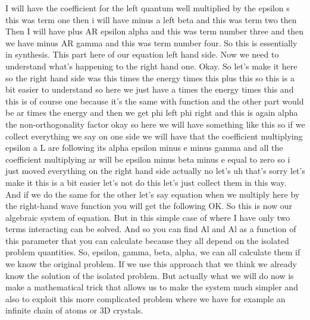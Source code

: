 I will have the coefficient for the left quantum well multiplied by the epsilon s this was term one then i will have minus a left beta and this was term two then Then I will have plus AR epsilon alpha and this was term number three and then we have minus AR gamma and this was term number four. So this is essentially in synthesis. This part here of our equation left hand side. Now we need to understand what's happening to the right hand one. Okay. So let's make it here so the right hand side was this times the energy times this plus this so this is a bit easier to understand so here we just have a times the energy times this and this is of course one because it's the same with function and the other part would be ar times the energy and then we get phi left phi right and this is again alpha the non-orthogonality factor okay so here we will have something like this so if we collect everything we say on one side we will have that the coefficient multiplying epsilon a L are following its alpha epsilon minus e minus gamma and all the coefficient multiplying ar will be epsilon minus beta minus e equal to zero so i just moved everything on the right hand side actually no let's uh that's sorry let's make it this is a bit easier let's not do this let's just collect them in this way.\\
And if we do the same for the other let's say equation when we multiply here by the right-hand wave function you will get the following OK. So this is now our algebraic system of equation. But in this simple case of where I have only two terms interacting can be solved. And so you can find Al and Al as a function of this parameter that you can calculate because they all depend on the isolated problem quantities. So, epsilon, gamma, beta, alpha, we can all calculate them if we know the original problem. If we use this approach that we think we already know the solution of the isolated problem. But actually what we will do now is make a mathematical trick that allows us to make the system much simpler and also to exploit this more complicated problem where we have for example an infinite chain of atoms or 3D crystals.\\
